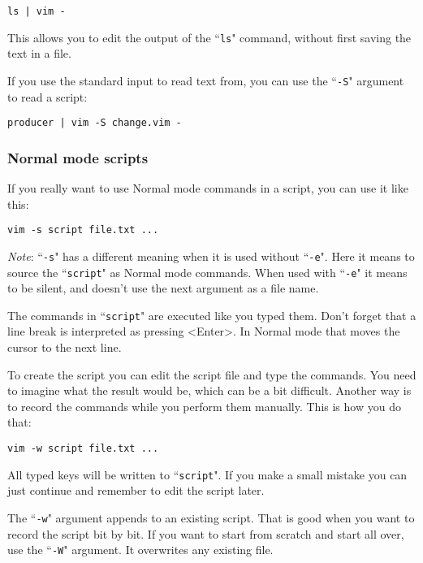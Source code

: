 \begin{Verbatim}[samepage=true]
 ls | vim -
\end{Verbatim}

This allows you to edit the output of the ``\texttt{ls}" command, without first saving the text in a file.

If you use the standard input to read text from, you can use the ``\texttt{-S}" argument to read a script:

\begin{Verbatim}[samepage=true]
 producer | vim -S change.vim -
\end{Verbatim}

\subsubsection{Normal mode scripts}
If you really want to use Normal mode commands in a script, you can use it like this:

\begin{Verbatim}[samepage=true]
 vim -s script file.txt ...
\end{Verbatim}
 
\emph{Note}: ``\texttt{-s}" has a different meaning when it is used without ``\texttt{-e}".
Here it means to source the ``\texttt{script}" as Normal mode commands.
When used with ``\texttt{-e}" it means to be silent, and doesn't use the next argument as a file name.

The commands in ``\texttt{script}" are executed like you typed them.
Don't forget that a line break is interpreted as pressing <Enter>.
In Normal mode that moves the cursor to the next line.

To create the script you can edit the script file and type the commands.
You need to imagine what the result would be, which can be a bit difficult.
Another way is to record the commands while you perform them manually.
This is how you do that:

\begin{Verbatim}[samepage=true]
 vim -w script file.txt ...
\end{Verbatim}

All typed keys will be written to ``\texttt{script}".
If you make a small mistake you can just continue and remember to edit the script later.

The ``\texttt{-w}" argument appends to an existing script.
That is good when you want to record the script bit by bit.
If you want to start from scratch and start all over, use the ``\texttt{-W}" argument.
It overwrites any existing file.
\clearpage

